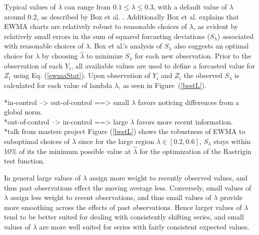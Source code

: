 \documentclass[12pt]{article}
\newcommand{\E}[1]{
        \mathbb{E}\left[~#1~\right]
}
\def \ix {
	\text{I}(\bm{x})
}
\begin{document}
%
Typical values of $\lambda$ can range from \mbox{$0.1\le\lambda\le0.3$}, with a default value of $\lambda$ around $0.2$, as described by Box et al. \cite{boxBook}.
Additionally Box et al. explains that EWMA charts are relatively robust to reasonable choices of $\lambda$, as evident by relatively small errors in the sum of squared forcasting deviations ($S_\lambda$) associated with reasonable choices of $\lambda$.
Box et al.'s analysis of $S_\lambda$ also suggests an optimal choice for $\lambda$ by choosing $\hat\lambda$ to minimize $S_\lambda$ \cite[p. 87]{boxBook} for each new observation.
%
Prior to the observation of each $Y_i$, all availiable values are used to define a forcasted value for $Z_i$ using Eq. (\ref{ewmaStat}).
Upon observation of $Y_i$ and $Z_i$ the observed $S_\lambda$ is calculated for each value of lambda $\lambda$, as seen in Figure~(\ref{bestL}).

%
%

{
\color{red} 
\noindent
*in-control --> out-of-control ==> small $\lambda$ favors noticing differences from a global norm. \\
*out-of-control --> in-control ==> large $\lambda$ favors more recent information. \\
*talk from masters project
}
Figure (\ref{bestL}) shows the robustness of EWMA to suboptimal choices of $\lambda$ since for the large region $\lambda\in[0.2, 0.6]$, $S_\lambda$ stays within 10\% of its the minimum possible value at $\hat \lambda$ for the optimization of the Rastrigin test function. 

%
%

In general large values of $\lambda$ assign more weight to recently observed values, and thus past observations effect the moving average less. %
%
Conversely, small values of $\lambda$ assign less weight to recent observations, and thus small values of $\lambda$ provide more smoothing across the effects of past observations. 
Hence larger values of $\lambda$ tend to be better suited for dealing with consistently shifting series, and small values of $\lambda$ are more well suited for series with fairly consistent expected values.
\end{document}
